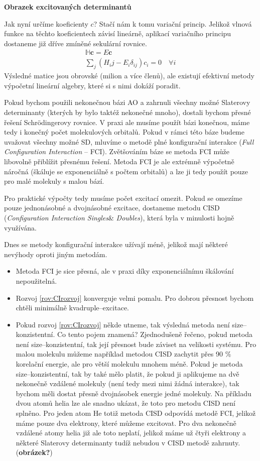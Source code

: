 \bigskip

\textbf{Obrazek excitovaných determinantů}

\bigskip

Jak nyní určíme koeficienty $c$? Stačí nám k tomu variační princip. Jelikož vlnová funkce na těchto koeficientech závisí lineárně, aplikací variačního principu dostaneme již dříve zmíněné sekulární rovnice.
\begin{eqnarray}
\mathbb{H}\mathbf{c}=E\mathbf{c} \nonumber \\
\sum_j (H_ij-E_i\delta_{ij})c_i=0 \quad \forall i
\end{eqnarray}
Výsledné matice jsou obrovské (milion a více členů), ale existují efektivní metody výpočetní lineární algebry, které si s nimi dokáží poradit.

Pokud bychom použili nekonečnou bázi AO a zahrnuli všechny možné Slaterovy determinanty (kterých by bylo taktéž nekonečné mnoho), dostali bychom přesné řešení Schr\"{o}dingerovy rovnice. V praxi ale musíme použít bázi konečnou, máme tedy i konečný počet molekulových orbitalů. Pokud v rámci této báze budeme uvažovat všechny možné SD, mluvíme o metodě plné konfigurační interakce (\textit{Full Configuration Interaction} -- FCI). Zvětšováním báze se metoda FCI může libovolně přiblížit přesnému řešení. Metoda FCI je ale extrémně výpočetně náročná (škáluje se exponenciálně s počtem orbitalů) a lze ji tedy použít pouze pro malé molekuly s malou bází.

Pro praktické výpočty tedy musíme počet excitací omezit. Pokud se omezíme pouze jednonásobné a dvojnásobné excitace, dostaneme metodu CISD (\textit{Configuration Interaction Singles}\& \textit{Doubles}), která byla v minulosti hojně využívána.

Dnes se metody konfigurační interakce užívají méně, jelikož mají některé nevýhody oproti jiným metodám. 
\begin{itemize}
\item Metoda FCI je sice přesná, ale v praxi díky exponenciálnímu škálování nepoužitelná.
\item Rozvoj \ref{rov:CIrozvoj} konverguje velmi pomalu. Pro dobrou přesnost bychom chtěli minimálně kvadruple--excitace.
\item Pokud rozvoj \ref{rov:CIrozvoj} někde utneme, tak výsledná metoda není size--konzistentní. Co tento pojem znamená? Zjednodušeně řečeno, pokud metoda není size--konzistentní, tak její přesnost bude záviset na velikosti systému. Pro malou molekulu můžeme například metodou CISD zachytit přes 90 \% korelační energie, ale pro větší molekulu mnohem méně. Pokud je metoda size--konzistentní, tak by také mělo platit, že pokud ji aplikujeme na dvě nekonečně vzdálené molekuly (není tedy mezi nimi žádná interakce), tak bychom měli dostat přesně dvojnásobek energie jedné molekuly. Na příkladu dvou atomů helia lze ale snadno ukázat, že toto pro metodu CISD není splněno. Pro jeden atom He totiž metoda CISD odpovídá metodě FCI, jelikož máme pouze dva elektrony, které můžeme excitovat. Pro dva nekonečně vzdálené atomy helia již ale toto neplatí, jelikož máme už čtyři elektrony a některé Slaterovy determinanty tudíž nebudou v CISD metodě zahrnuty. (\textbf{obrázek?})
\end{itemize}


